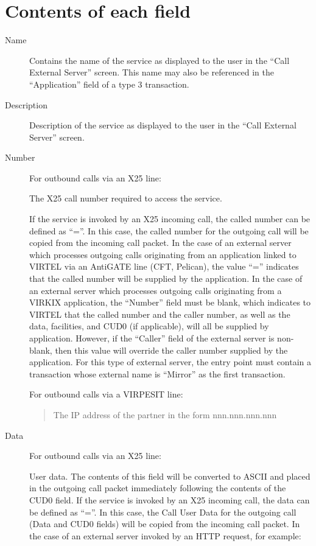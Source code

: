 \documentclass[letterpaper,10pt,english]{sphinxmanual}
\begin{document}
\section{Contents of each field}
\label{\detokenize{connectivity_guide:id25}}\begin{description}
\item[{Name}] \leavevmode
Contains the name of the service as displayed to the user in the “Call External Server” screen. This name may also be referenced in the “Application” field of a type 3 transaction.

\item[{Description}] \leavevmode
Description of the service as displayed to the user in the “Call External Server” screen.

\item[{Number}] \leavevmode
For outbound calls via an X25 line:

The X25 call number required to access the service.

If the service is invoked by an X25 incoming call, the called number can be defined as “=”. In this case, the called number for the outgoing call will be copied from the incoming call packet. In the case of an external server which processes outgoing calls originating from an application linked to VIRTEL via an AntiGATE line (CFT, Pelican), the value “=” indicates that the called number will be supplied by the application. In the case of an external server which processes outgoing calls originating from a VIRKIX application, the “Number” field must be blank, which indicates to VIRTEL that the called number and the caller number, as well as the data, facilities, and CUD0 (if applicable), will all be supplied by application. However, if the “Caller” field of the external server is non-blank, then this value will override the caller number supplied by the application. For this type of external server, the entry point must contain a transaction whose external name is “Mirror” as the first transaction.

For outbound calls via a VIRPESIT line:
\begin{quote}

The IP address of the partner in the form nnn.nnn.nnn.nnn
\end{quote}

\item[{Data}] \leavevmode
For outbound calls via an X25 line:

User data. The contents of this field will be converted to ASCII and placed in the outgoing call packet immediately following the contents of the CUD0 field. If the service is invoked by an X25 incoming call, the data can be defined as “=”. In this case, the Call User Data for the outgoing call (Data and CUD0 fields) will be copied from the incoming call packet. In the case of an external server invoked by an HTTP request, for example:

\end{description}
\end{document}
